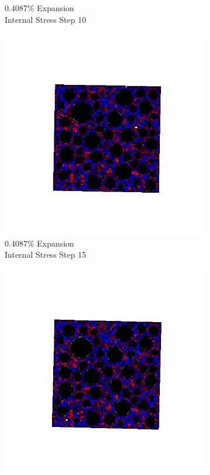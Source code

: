 \begin{figure}[ht!]
\begin{subfigure}{.25\textwidth}
      \caption{0.4087\% Expansion\\Internal Stress Step 10}
    \end{subfigure}%
    \begin{subfigure}{.25\textwidth}
      \centering
      \includegraphics[width=1.0\linewidth]{Files/exp_3D/DEF/A30X-1C_2_s15.png}
      \caption{0.4087\% Expansion\\Internal Stress Step 15}
    \end{subfigure}%
    \begin{subfigure}{.25\textwidth}
      \centering
      \includegraphics[width=1.0\linewidth]{Files/exp_3D/DEF/A30X-1C_2_stress.png}

\end{subfigure}
\end{figure}
